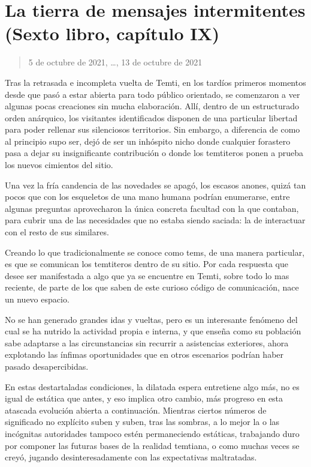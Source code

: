 \documentclass[
  spanish,
]{book}
\begin{document}
\hypertarget{la-tierra-de-mensajes-intermitentes-sexto-libro-capuxedtulo-ix}{%
\section{La tierra de mensajes intermitentes (Sexto libro, capítulo IX)}\label{la-tierra-de-mensajes-intermitentes-sexto-libro-capuxedtulo-ix}}

\begin{quote}
5 de octubre de 2021, \ldots, 13 de octubre de 2021
\end{quote}

Tras la retrasada e incompleta vuelta de Temti, en los tardíos primeros momentos desde que pasó a estar abierta para todo público orientado, se comenzaron a ver algunas pocas creaciones sin mucha elaboración. Allí, dentro de un estructurado orden anárquico, los visitantes identificados disponen de una particular libertad para poder rellenar sus silenciosos territorios. Sin embargo, a diferencia de como al principio supo ser, dejó de ser un inhóspito nicho donde cualquier forastero pasa a dejar su insignificante contribución o donde los temtiteros ponen a prueba los nuevos cimientos del sitio.

Una vez la fría candencia de las novedades se apagó, los escasos anones, quizá tan pocos que con los esqueletos de una mano humana podrían enumerarse, entre algunas preguntas aprovecharon la única concreta facultad con la que contaban, para cubrir una de las necesidades que no estaba siendo saciada: la de interactuar con el resto de sus similares.

Creando lo que tradicionalmente se conoce como tems, de una manera particular, es que se comunican los temtiteros dentro de su sitio. Por cada respuesta que desee ser manifestada a algo que ya se encuentre en Temti, sobre todo lo mas reciente, de parte de los que saben de este curioso código de comunicación, nace un nuevo espacio.

No se han generado grandes idas y vueltas, pero es un interesante fenómeno del cual se ha nutrido la actividad propia e interna, y que enseña como su población sabe adaptarse a las circunstancias sin recurrir a asistencias exteriores, ahora explotando las ínfimas oportunidades que en otros escenarios podrían haber pasado desapercibidas.

En estas destartaladas condiciones, la dilatada espera entretiene algo más, no es igual de estática que antes, y eso implica otro cambio, más progreso en esta atascada evolución abierta a continuación. Mientras ciertos números de significado no explícito suben y suben, tras las sombras, a lo mejor la o las incógnitas autoridades tampoco estén permaneciendo estáticas, trabajando duro por componer las futuras bases de la realidad temtiana, o como muchas veces se creyó, jugando desinteresadamente con las expectativas maltratadas.
\end{document}
